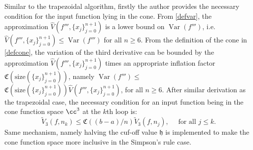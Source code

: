 \documentclass{iitthesis}
\DeclareMathOperator{\Var}{Var}
\theoremstyle{definition}
\theoremstyle{remark}
\begin{document}
Similar to the trapezoidal algorithm, firstly the author provides the necessary condition for the input function lying in the cone. From \eqref{defvar}, the approximation $\widehat{V}({f'''},\{x_j\}_{j=0}^{n+1})$ is a lower bound on $\Var({f'''})$, i.e. $\widehat{V}({f'''},\{x_j\}_{j=0}^{n+1})\leq \Var({f'''})$ for all $n \ge 6$. From the definition of the cone in \eqref{defcone}, the variation of the third derivative can be bounded by the approximation $\widehat{V}({f'''},\{x_j\}_{j=0}^{n+1})$ times an appropriate inflation factor $\mathfrak{C}(\text{size}(\{x_j\}_{j=0}^{n+1}))$, namely $\Var({f'''})\leq$$\mathfrak{C}(\text{size}(\{x_j\}_{j=0}^{n+1}))\widehat{V}({f'''},\{x_j\}_{j=0}^{n+1})$, for all $n \ge 6$. After similar derivation as the trapezoidal case, the necessary condition for an input function being in the cone function space $\cc^3$ at the $k$th loop is:
\begin{equation}\label{necconsim}
    \widetilde{V}_3(f,n_k)\leq\mathfrak{C}((b-a)/n)\widetilde{V}_3(f,n_j), \quad \text{ for all } j \leq k.
\end{equation}
Same mechanism, namely halving the cuf-off value $\mathfrak{h}$ is implemented to make the cone function space more inclusive in the Simpson's rule case.
\end{document}
